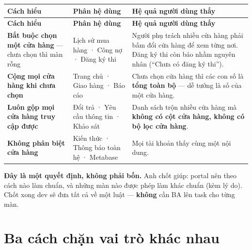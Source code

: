 {\footnotesize
\begin{longtable}{@{}L{4.6cm}L{4.2cm}L{6.2cm}@{}}
\textbf{Cách hiểu} & \textbf{Phân hệ dùng} & \textbf{Hệ quả người dùng thấy}\\
\midrule \endfirsthead
{}\textbf{Cách hiểu} & \textbf{Phân hệ dùng} & \textbf{Hệ quả người dùng thấy}\\
\midrule \endhead
\textbf{Bắt buộc chọn một cửa hàng} --- chưa chọn thì màn rỗng &
  Lịch sử mua hàng · Công nợ · Đăng ký thi &
  Người phụ trách nhiều cửa hàng phải bấm đổi cửa hàng để xem từng nơi. Đăng ký thi còn báo nhầm nguyên nhân (``Chưa có đăng ký thi''). \\ \addlinespace
\textbf{Cộng mọi cửa hàng khi chưa chọn} &
  Trang chủ · Giao hàng · Báo cáo &
  Chưa chọn cửa hàng thì các con số là \textbf{tổng toàn bộ} --- dễ tưởng là số của một cửa hàng. \\ \addlinespace
\textbf{Luôn gộp mọi cửa hàng truy cập được} &
  Đổi trả · Yêu cầu thông tin · Khảo sát &
  Danh sách trộn nhiều cửa hàng mà \textbf{không có cột cửa hàng, không có bộ lọc cửa hàng}. \\ \addlinespace
\textbf{Không phân biệt cửa hàng} &
  Kiến thức · Thông báo toàn hệ · Metabase &
  Mọi tài khoản thấy cùng một nội dung. \\
\end{longtable}}

\begin{ask}
\textbf{Đây là một quyết định, không phải bốn.} Anh chốt giúp: portal nên theo cách nào làm
chuẩn, và những màn nào được phép làm khác chuẩn (kèm lý do). Chốt xong dev sẽ đưa tất cả về
một luật --- \textbf{không} cần BA lên task cho từng màn.
\end{ask}

\section{Ba cách chặn vai trò khác nhau}
\label{sec:vai-tro}

